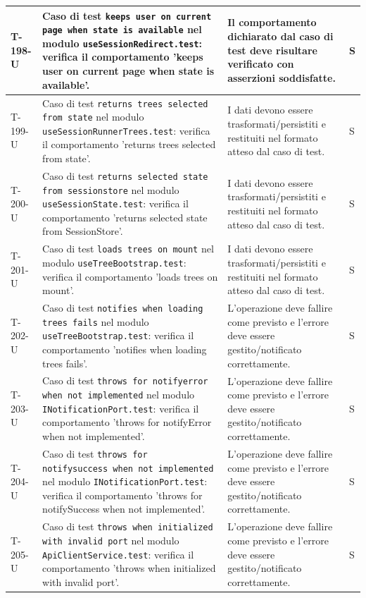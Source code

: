 \documentclass[a4paper,12pt]{article}
\begin{document}
{{\begin{longtable}{|>{\RaggedRight\arraybackslash}p{1.55cm}|>{\RaggedRight\arraybackslash}p{8.0cm}|>{\RaggedRight\arraybackslash}p{4.6cm}|>{\RaggedRight\arraybackslash}p{1.2cm}|}
        \hline
        T-198-U & Caso di test \texttt{keeps user on current page when state is available} nel modulo \texttt{useSessionRedirect.test}: verifica il comportamento 'keeps user on current page when state is available'. & Il comportamento dichiarato dal caso di test deve risultare verificato con asserzioni soddisfatte. & S \\
        \hline
        T-199-U & Caso di test \texttt{returns trees selected from state} nel modulo \texttt{useSessionRunnerTrees.test}: verifica il comportamento 'returns trees selected from state'. & I dati devono essere trasformati/persistiti e restituiti nel formato atteso dal caso di test. & S \\
        \hline
        T-200-U & Caso di test \texttt{returns selected state from sessionstore} nel modulo \texttt{useSessionState.test}: verifica il comportamento 'returns selected state from SessionStore'. & I dati devono essere trasformati/persistiti e restituiti nel formato atteso dal caso di test. & S \\
        \hline
        T-201-U & Caso di test \texttt{loads trees on mount} nel modulo \texttt{useTreeBootstrap.test}: verifica il comportamento 'loads trees on mount'. & I dati devono essere trasformati/persistiti e restituiti nel formato atteso dal caso di test. & S \\
        \hline
        T-202-U & Caso di test \texttt{notifies when loading trees fails} nel modulo \texttt{useTreeBootstrap.test}: verifica il comportamento 'notifies when loading trees fails'. & L'operazione deve fallire come previsto e l'errore deve essere gestito/notificato correttamente. & S \\
        \hline
        T-203-U & Caso di test \texttt{throws for notifyerror when not implemented} nel modulo \texttt{INotificationPort.test}: verifica il comportamento 'throws for notifyError when not implemented'. & L'operazione deve fallire come previsto e l'errore deve essere gestito/notificato correttamente. & S \\
        \hline
        T-204-U & Caso di test \texttt{throws for notifysuccess when not implemented} nel modulo \texttt{INotificationPort.test}: verifica il comportamento 'throws for notifySuccess when not implemented'. & L'operazione deve fallire come previsto e l'errore deve essere gestito/notificato correttamente. & S \\
        \hline
        T-205-U & Caso di test \texttt{throws when initialized with invalid port} nel modulo \texttt{ApiClientService.test}: verifica il comportamento 'throws when initialized with invalid port'. & L'operazione deve fallire come previsto e l'errore deve essere gestito/notificato correttamente. & S \\

\end{longtable}}}
\end{document}
